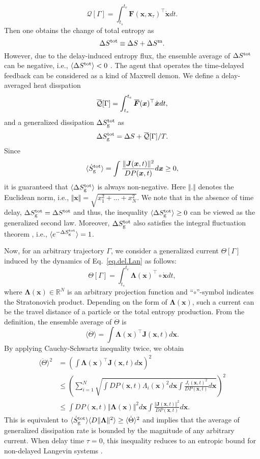 \documentclass[pre,
twocolumn,
]{revtex4-1}
\newcommand{\overbar}[1]{\mkern 1.5mu\overline{\mkern-1.5mu#1\mkern-1.5mu}\mkern 1.5mu}
\theoremstyle{definition}
\theoremstyle{definition}
\newcommand{\bol}{\boldsymbol}
\newcommand{\mca}{\mathcal}
\newcommand{\mbb}{\mathbb}
\newcommand{\eq}[1]{\begin{equation}#1\end{equation}}
\newcommand{\als}[1]{\begin{align*}#1\end{align*}}
\newcommand{\avg}[1]{\langle #1\rangle}
\newcommand{\inl}[1]{$ #1 $}
\newcommand{\bra}[1]{\left( #1 \right)}
\newcommand{\norm}[1]{\Vert #1 \Vert}
\begin{document}
\eq{
\mca{Q}[\Gamma]=\int_{t_s}^{t_e} \bol{F}(\bol{x},\bol{x}_\tau)^\top\dot{\bol{x}}dt.
}
Then one obtains the change of total entropy as
\eq{
\Delta S^{\rm tot}\equiv\Delta S+\Delta S^{\rm m}.
}
However, due to the delay-induced entropy flux, the ensemble average of \inl{\Delta S^{\rm tot}} can be negative, i.e., \inl{\avg{\Delta S^{\rm tot}}<0} \cite{Jiang.2011.PRE}.
The agent that operates the time-delayed feedback can be considered as a kind of Maxwell demon.
We define a delay-averaged heat disspation
\eq{
\overbar{\mca{Q}}[\Gamma]=\int_{t_s}^{t_e} \overbar{\bol{F}}(\bol{x})^\top\dot{\bol{x}}dt,
}
and a generalized dissipation \inl{\Delta S_{\rm g}^{\rm tot}} as
\eq{
\Delta S_{\rm g}^{\rm tot}=\Delta S+\overbar{\mca{Q}}[\Gamma]/T.
}
Since
\eq{
\avg{\dot{S}_{\rm g}^{\rm tot}}=\int\frac{\norm{\bol{J}(\bol{x},t)}^2}{DP(\bol{x},t)}d\bol{x}\geq 0,
}
it is guaranteed that \inl{\avg{\Delta S_{\rm g}^{\rm tot}}} is always non-negative.
Here \inl{\norm{.}} denotes the Euclidean norm, i.e., \inl{\norm{\bol{x}}=\sqrt{x_1^2+\dots+x_N^2}}.
We note that in the absence of time delay, \inl{\Delta S_{\rm g}^{\rm tot}=\Delta S^{\rm tot}} and thus, the inequality \inl{\avg{\Delta S_{\rm g}^{\rm tot}}\ge 0} can be viewed as the generalized second law.
Moreover, \inl{\Delta S_{\rm g}^{\rm tot}} also satisfies the integral fluctuation theorem \cite{Jiang.2011.PRE}, i.e., \inl{\avg{e^{-\Delta S_{\rm g}^{\rm tot}}}=1}.

Now, for an arbitrary trajectory \inl{\Gamma}, we consider a generalized current \inl{\Theta[\Gamma]} induced by the dynamics of Eq.~\eqref{eq.del.Lan} as follows:
\eq{
\Theta[\Gamma]=\int_{t_s}^{t_e}\bol{\Lambda}(\bol{x})^\top\circ\dot{\bol{x}}dt,
}
where \inl{\bol{\Lambda}(\bol{x})\in\mbb{R}^N} is an arbitrary projection function and ``\inl{\circ}''-symbol indicates the Stratonovich product.
Depending on the form of \inl{\bol{\Lambda}(\bol{x})}, such a current can be the travel distance of a particle or the total entropy production.
From the definition, the ensemble average of \inl{\dot{\Theta}} is 
\eq{
\avg{\dot{\Theta}}=\int\bol{\Lambda}(\bol{x})^\top\bol{J}(\bol{x},t)d\bol{x}.
}
By applying Cauchy-Schwartz inequality twice, we obtain
\als{
\avg{\dot{\Theta}}^2&=\bra{\int\bol{\Lambda}(\bol{x})^\top\bol{J}(\bol{x},t)d\bol{x}}^2\\
&\le\bra{\sum_{i=1}^N\sqrt{\int DP(\bol{x},t)\Lambda_i(\bol{x})^2d\bol{x}\int \frac{J_i(\bol{x},t)^2}{DP(\bol{x},t)}d\bol{x}}}^2\\
&\le\int DP(\bol{x},t)\norm{\bol{\Lambda}(\bol{x})}^2d\bol{x}\int \frac{\norm{\bol{J}(\bol{x},t)}^2}{DP(\bol{x},t)}d\bol{x}.
}
This is equivalent to \inl{\avg{\dot{S}_{\rm g}^{\rm tot}}\avg{D\norm{\bol{\Lambda}}^2}\ge\avg{\dot{\Theta}}^2} and implies that the average of generalized dissipation rate is bounded by the magnitude of any arbitrary current.
When delay time \inl{\tau=0}, this inequality reduces to an entropic bound for non-delayed Langevin systems \cite{Andreas.2018.PRE}.
\end{document}
